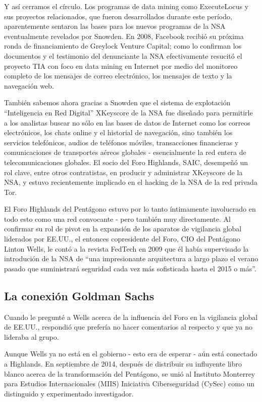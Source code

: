 \documentclass[10pt,a5paper,twoside,spanish,]{book}
\begin{document}
Y así cerramos el círculo. Los programas de data mining como
ExecuteLocus y sus proyectos relacionados, que fueron desarrollados
durante este período, aparentemente sentaron las bases para los nuevos
programas de la NSA eventualmente revelados por Snowden. En 2008,
Facebook recibió su próxima ronda de financiamiento de Greylock Venture
Capital; como lo confirman los documentos y el testimonio del
denunciante la NSA efectivamente resucitó el proyecto TIA con foco en
data mining en Internet por medio del monitoreo completo de los mensajes
de correo electrónico, los mensajes de texto y la navegación web.

También sabemos ahora gracias a Snowden que el sistema de explotación
``Inteligencia en Red Digital'' XKeyscore de la NSA fue diseñado para
permitirle a los analistas buscar no sólo en las bases de datos de
Internet como los correos electrónicos, los chats online y el historial
de navegación, sino también los servicios telefónicos, audios de
teléfonos móviles, transacciones financieras y comunicaciones de
transportes aéreos globales - esencialmente la red entera de
telecomunicaciones globales. El socio del Foro Highlands, SAIC,
desempeñó un rol clave, entre otros contratistas, en producir y
administrar XKeyscore de la NSA, y estuvo recientemente implicado en el
hacking de la NSA de la red privada Tor.

El Foro Highlands del Pentágono estuvo por lo tanto íntimamente
involucrado en todo esto como una red convocante - pero también muy
directamente. Al confirmar su rol de pivot en la expansión de los
aparatos de vigilancia global liderados por EE.UU., el entonces
copresidente del Foro, CIO del Pentágono Linton Wells, le contó a la
revista FedTech en 2009 que él había supervisado la introdución de la
NSA de ``una impresionante arquitectura a largo plazo el verano pasado
que suministrará seguridad cada vez más sofisticada hasta el 2015 o
más''.

\subsection{La conexión Goldman
Sachs}\label{la-conexiuxf3n-goldman-sachs}

Cuando le pregunté a Wells acerca de la influencia del Foro en la
vigilancia global de EE.UU., respondió que prefería no hacer comentarios
al respecto y que ya no lideraba al grupo.

Aunque Wells ya no está en el gobierno - esto era de esperar - aún está
conectado a Highlands. En septiembre de 2014, después de distribuir su
influyente libro blanco acerca de la transformación del Pentágono, se
unió al Instituto Monterrey para Estudios Internacionales (MIIS)
Iniciativa Ciberseguridad (CySec) como un distinguido y experimentado
investigador.
\end{document}

